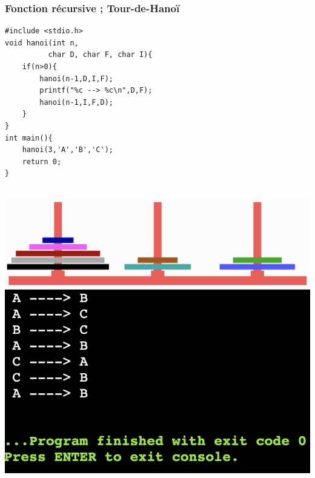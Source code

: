 \documentclass{beamer}
\begin{document}

\begin{frame}[fragile]
\frametitle{Fonction récursive ; Tour-de-Hanoï}
\begin{multicols}{2}
\begin{verbatim}  
#include <stdio.h>
void hanoi(int n, 
          char D, char F, char I){
    if(n>0){
        hanoi(n-1,D,I,F);
        printf("%c --> %c\n",D,F);
        hanoi(n-1,I,F,D);
    }
}
int main(){ 
    hanoi(3,'A','B','C');
    return 0; 
}
\end{verbatim}
\\
\includegraphics[scale=0.25]{hanoi.png} 
\includegraphics[scale=0.4]{hanoi2.png} 
\end{multicols}
\end{frame}
\end{document}
